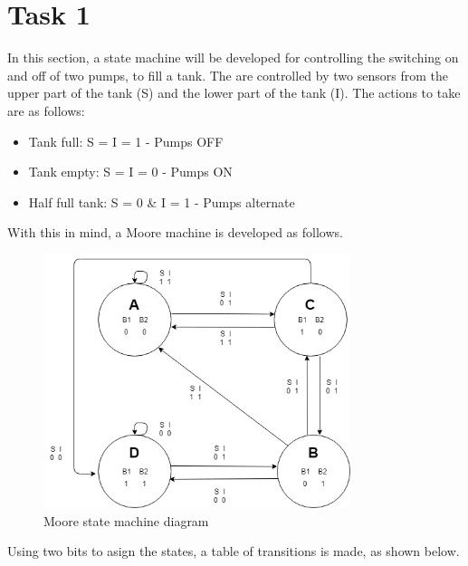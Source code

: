


\providecommand{\tabularnewline}{\\}
\section*{Task 1}

In this section, a state machine will be 
developed for controlling the switching
on and off of two pumps, to fill a tank.
The are controlled by two sensors from 
the upper part of the tank (S) and the 
lower part of the tank (I). The actions
to take are as follows:

\begin{itemize}
    \item Tank full: S = I = 1 - Pumps OFF
    \item Tank empty: S = I = 0 - Pumps ON
    \item Half full tank: S = 0 \& I = 1 - Pumps alternate 
\end{itemize}

With this in mind, a Moore machine is 
developed as follows.

\begin{figure}[H]
    \begin{centering}
    \includegraphics[width=0.8\textwidth]{Graficos1/1a_fsm.png}
    \par\end{centering}
    \caption{Moore state machine diagram}
\end{figure}

Using two bits to asign the states, a table 
of transitions is made, as shown below.

